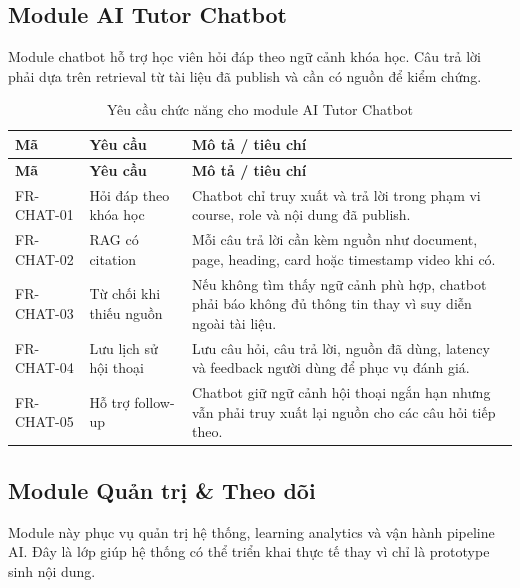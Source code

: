 \subsection{Module AI Tutor Chatbot}
\label{subsec:module-ai-tutor-chatbot}

Module chatbot hỗ trợ học viên hỏi đáp theo ngữ cảnh khóa học. Câu trả lời phải
dựa trên retrieval từ tài liệu đã publish và cần có nguồn để kiểm chứng.

\begin{longtable}{|p{2.4cm}|p{5.1cm}|p{6.9cm}|}
\caption{Yêu cầu chức năng cho module AI Tutor Chatbot}
\label{tab:fr-ai-tutor}\\
\hline
\textbf{Mã} & \textbf{Yêu cầu} & \textbf{Mô tả / tiêu chí} \\
\hline
\endfirsthead
\hline
\textbf{Mã} & \textbf{Yêu cầu} & \textbf{Mô tả / tiêu chí} \\
\hline
\endhead
FR-CHAT-01 & Hỏi đáp theo khóa học & Chatbot chỉ truy xuất và trả lời trong phạm vi course, role và nội dung đã publish. \\
\hline
FR-CHAT-02 & RAG có citation & Mỗi câu trả lời cần kèm nguồn như document, page, heading, card hoặc timestamp video khi có. \\
\hline
FR-CHAT-03 & Từ chối khi thiếu nguồn & Nếu không tìm thấy ngữ cảnh phù hợp, chatbot phải báo không đủ thông tin thay vì suy diễn ngoài tài liệu. \\
\hline
FR-CHAT-04 & Lưu lịch sử hội thoại & Lưu câu hỏi, câu trả lời, nguồn đã dùng, latency và feedback người dùng để phục vụ đánh giá. \\
\hline
FR-CHAT-05 & Hỗ trợ follow-up & Chatbot giữ ngữ cảnh hội thoại ngắn hạn nhưng vẫn phải truy xuất lại nguồn cho các câu hỏi tiếp theo. \\
\hline
\end{longtable}

\subsection{Module Quản trị \& Theo dõi}
\label{subsec:module-quan-tri-theo-doi}

Module này phục vụ quản trị hệ thống, learning analytics và vận hành pipeline
AI. Đây là lớp giúp hệ thống có thể triển khai thực tế thay vì chỉ là prototype
sinh nội dung.

